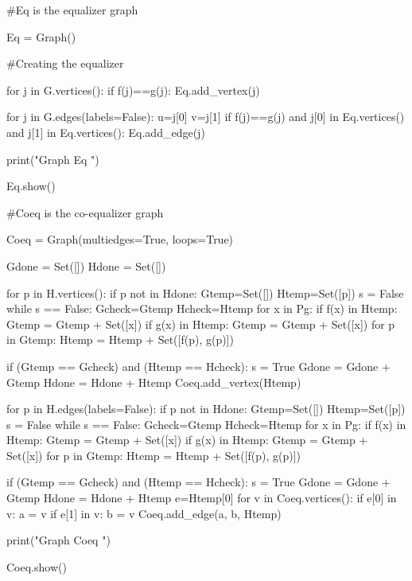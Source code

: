 \documentclass{ximera}
\begin{document}
\begin{sageCell}
#Eq is the equalizer graph

Eq = Graph()

#Creating the equalizer


for j in G.vertices():
    if f(j)==g(j):
        Eq.add_vertex(j)


for j in G.edges(labels=False):
    u=j[0]
    v=j[1]
    if f(j)==g(j) and j[0] in Eq.vertices() and j[1] in Eq.vertices():
        Eq.add_edge(j)


print("\n\n Graph Eq \n\n")

Eq.show()

#Coeq is the co-equalizer graph

Coeq = Graph(multiedges=True, loops=True)

Gdone = Set([])
Hdone = Set([])

for p in H.vertices():
    if p not in Hdone:
        Gtemp=Set([])
        Htemp=Set([p])
        s = False
        while s == False:
            Gcheck=Gtemp
            Hcheck=Htemp
            for x in Pg:
                if f(x) in Htemp:
                    Gtemp = Gtemp + Set([x])
                if g(x) in Htemp:
                    Gtemp = Gtemp + Set([x])
            for p in Gtemp:
                Htemp = Htemp + Set([f(p), g(p)])

            if (Gtemp == Gcheck) and (Htemp == Hcheck):
                s = True
                Gdone = Gdone + Gtemp
                Hdone = Hdone + Htemp
                Coeq.add_vertex(Htemp)


for p in H.edges(labels=False):
    if p not in Hdone:
        Gtemp=Set([])
        Htemp=Set([p])
        s = False
        while s == False:
            Gcheck=Gtemp
            Hcheck=Htemp
            for x in Pg:
                if f(x) in Htemp:
                    Gtemp = Gtemp + Set([x])
                if g(x) in Htemp:
                    Gtemp = Gtemp + Set([x])
            for p in Gtemp:
                Htemp = Htemp + Set([f(p), g(p)])

            if (Gtemp == Gcheck) and (Htemp == Hcheck):
                s = True
                Gdone = Gdone + Gtemp
                Hdone = Hdone + Htemp
                e=Htemp[0]
                for v in Coeq.vertices():
                    if e[0] in v:
                        a = v
                    if e[1] in v:
                        b = v
                Coeq.add_edge(a, b, Htemp)


print("\n\n Graph Coeq \n\n")

Coeq.show()
\end{sageCell}
\end{document}
